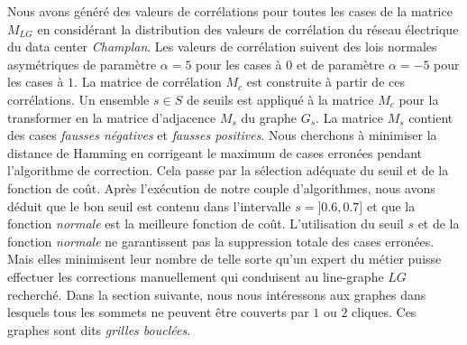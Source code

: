 Nous avons g\'en\'er\'e des valeurs de corr\'elations pour toutes les cases de la matrice $M_{LG}$ en consid\'erant la distribution des valeurs de corr\'elation du r\'eseau \'electrique du data center {\em Champlan}. 
Les valeurs de corr\'elation suivent des lois normales asym\'etriques de param\`etre $\alpha = 5$ pour les cases \`a $0$ et  de param\`etre $\alpha = -5$ pour les cases \`a $1$.
La matrice de corr\'elation $M_c$ est construite \`a partir de ces corr\'elations.
Un ensemble $s \in S$ de seuils est appliqu\'e \`a la matrice $M_c$ pour la transformer en la matrice d'adjacence $M_s$ du graphe $G_s$. 
La matrice $M_s$ contient des cases {\em fausses n\'egatives} et {\em fausses positives}. 
Nous cherchons \`a minimiser la distance de Hamming en corrigeant le maximum de cases erron\'ees pendant l'algorithme de correction. Cela passe par la s\'election ad\'equate du seuil et de la fonction de co\^ut.
Apr\`es l'ex\'ecution de notre couple d'algorithmes, nous  avons d\'eduit que le bon seuil est contenu dans l'intervalle $s = ]0.6,0.7]$ et que la fonction {\em normale} est la meilleure fonction de co\^ut. 
L'utilisation du seuil $s$ et de la fonction {\em normale} ne garantissent pas la suppression totale des cases erron\'ees.  Mais elles minimisent leur nombre de telle sorte qu'un expert du m\'etier puisse effectuer les corrections manuellement qui conduisent au line-graphe $LG$ recherch\'e.
Dans la section suivante, nous nous int\'eressons aux graphes dans lesquels tous les sommets ne peuvent \^etre couverts par $1$ ou $2$ cliques. Ces graphes sont dits {\em grilles boucl\'ees}. 